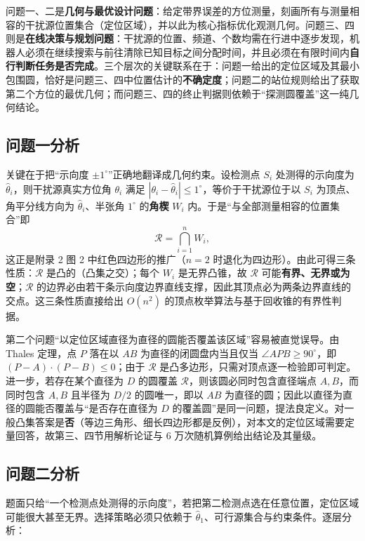 \documentclass[withoutpreface,bwprint]{cumcmthesis}
\begin{document}
问题一、二是\textbf{几何与最优设计问题}：给定带界误差的方位测量，刻画所有与测量相容的干扰源位置集合（定位区域），并以此为核心指标优化观测几何。问题三、四则是\textbf{在线决策与规划问题}：干扰源的位置、频道、个数均需在行进中逐步发现，机器人必须在继续搜索与前往清除已知目标之间分配时间，并且必须在有限时间内\textbf{自行判断任务是否完成}。三个层次的关键联系在于：问题一给出的定位区域及其最小包围圆，恰好是问题三、四中位置估计的\textbf{不确定度}；问题二的站位规则给出了获取第二个方位的最优几何；而问题三、四的终止判据则依赖于“探测圆覆盖”这一纯几何结论。

\subsection{问题一分析}

关键在于把“示向度 $\pm1^{\circ}$”正确地翻译成几何约束。设检测点 $S_i$ 处测得的示向度为 $\hat\theta_i$，则干扰源真实方位角 $\theta_i$ 满足 $|\theta_i-\hat\theta_i|\le 1^{\circ}$，等价于干扰源位于以 $S_i$ 为顶点、角平分线方向为 $\hat\theta_i$、半张角 $1^{\circ}$ 的\textbf{角楔} $W_i$ 内。于是“与全部测量相容的位置集合”即
\[
\mathcal{R}=\bigcap_{i=1}^{n} W_i,
\]
这正是附录 2 图 2 中红色四边形的推广（$n=2$ 时退化为四边形）。由此可得三条性质：$\mathcal{R}$ 是凸的（凸集之交）；每个 $W_i$ 是无界凸锥，故 $\mathcal{R}$ 可能\textbf{有界、无界或为空}；$\mathcal{R}$ 的边界必由若干条示向度边界直线支撑，因此其顶点必为两条边界直线的交点。这三条性质直接给出 $O(n^2)$ 的顶点枚举算法与基于回收锥的有界性判据。

第二个问题“以定位区域直径为直径的圆能否覆盖该区域”容易被直觉误导。由 Thales 定理，点 $P$ 落在以 $AB$ 为直径的闭圆盘内当且仅当 $\angle APB\ge90^{\circ}$，即 $(P-A)\cdot(P-B)\le0$；由于 $\mathcal{R}$ 是凸多边形，只需对顶点逐一检验即可判定。进一步，若存在某个直径为 $D$ 的圆覆盖 $\mathcal{R}$，则该圆必同时包含直径端点 $A,B$，而同时包含 $A,B$ 且半径为 $D/2$ 的圆唯一，即以 $AB$ 为直径的圆；因此以直径为直径的圆能否覆盖与“是否存在直径为 $D$ 的覆盖圆”是同一问题，提法良定义。对一般凸集答案是\textbf{否}（等边三角形、细长四边形都是反例），对本文的定位区域需要定量回答，故第三、四节用解析论证与 6 万次随机算例给出结论及其量级。

\subsection{问题二分析}

题面只给“一个检测点处测得的示向度”，若把第二检测点选在任意位置，定位区域可能很大甚至无界。选择策略必须只依赖于 $\hat\theta_1$、可行源集合与约束条件。逐层分析：
\end{document}
